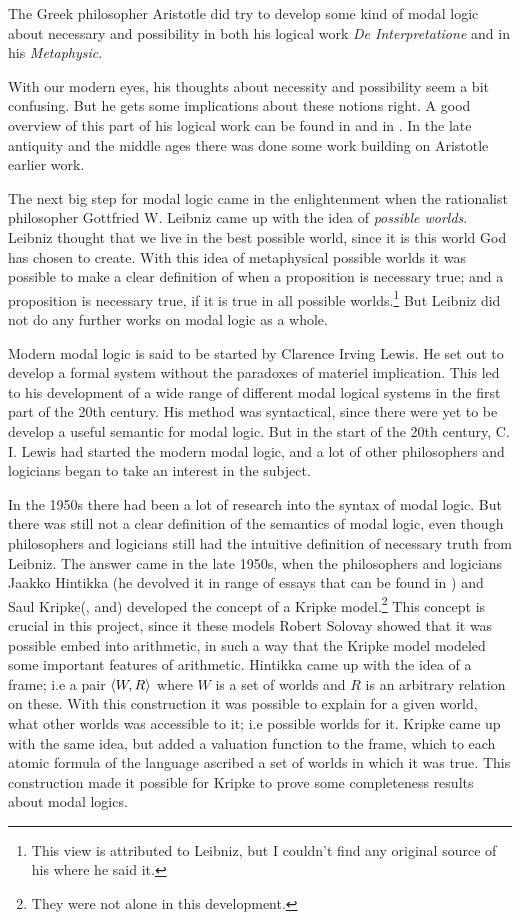 \documentclass[../main.tex]{subfiles}
\begin{document}
The Greek philosopher Aristotle did try to develop some kind of modal logic
about necessary and possibility in both his logical work \textit{De
Interpretatione} and in his
 \textit{Metaphysic}.

With our modern eyes, his thoughts about necessity  and possibility seem a
bit confusing. But he gets some implications about these notions right. A good
overview of this part of his logical work can be found in \parencite{Lemmon1977} and
in \parencite{Luka1957}.
In the late antiquity and the middle ages there was done some work building on 
Aristotle earlier work. 

The next big step for modal logic came in the enlightenment when the
rationalist philosopher Gottfried W. Leibniz came up with the idea of \textit{possible
worlds}.  Leibniz thought that we live in the best possible world, since it is
this world God has chosen to create\parencite{Leibniz1760}. With this idea of metaphysical possible
worlds it was possible to make a clear definition of when a proposition is
necessary true; and a proposition is necessary true, if it is true in all
possible worlds.\footnote{This view is attributed to Leibniz, but I couldn't
find any original source of his where he said it.}
But Leibniz did not do any further works on modal logic as a
whole.

Modern modal logic is said to be started by Clarence Irving Lewis. He set out
to develop a formal system without the paradoxes of materiel
implication. This led to his development of a wide range of different modal
logical systems in the first part of the 20th century. His method was
syntactical, since there were yet to be develop a useful semantic for modal
logic. But in the start of the 20th century, C. I. Lewis had started the modern
modal logic, and a lot of other philosophers and logicians began to take an
interest in the subject.


In the 1950s there had been a lot of research into the syntax of modal logic.
But there was still not a clear definition of the semantics of modal logic,
even though philosophers and logicians still had the intuitive definition of
necessary truth from Leibniz. The answer came in the late 1950s, when the
philosophers and logicians Jaakko Hintikka (he devolved it in range of essays
that can be found in \cite{Hintikka1969})
and Saul Kripke(\cite{Kripke1959a}, \cite{Kripke1959b} and\cite{Kripke1963}) developed the concept of a Kripke model.\footnote{They were not
	alone in this development.} This concept is crucial in this project,
since it these models Robert Solovay showed that it was possible embed into
arithmetic, in such a way that the Kripke model modeled some important features
of arithmetic.
Hintikka came up with the idea of a frame; i.e a pair $\langle W,R\rangle$ where $W$ is
a set of worlds and $R$ is an arbitrary relation on these. With this
construction it was possible to explain for a given world, what other worlds
was accessible to it; i.e possible worlds for it. Kripke came up with the same
idea, but added a valuation function to the frame, which to each atomic formula of the
language ascribed a set of worlds in which it was true.  This construction made
it possible for Kripke to prove some completeness results about modal logics.
\end{document}
